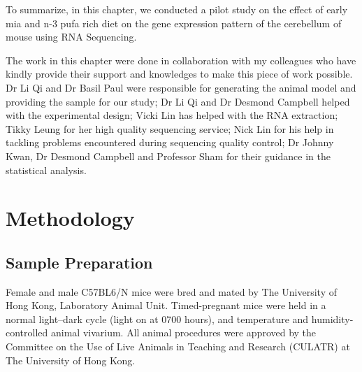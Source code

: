 To summarize, in this chapter, we conducted a pilot study on the effect of early \gls{mia} and n-3 \gls{pufa} rich diet on the gene expression pattern of the cerebellum of mouse using RNA Sequencing.

The work in this chapter were done in collaboration with my colleagues who have kindly provide their support and knowledges to make this piece of work possible.
Dr Li Qi and Dr Basil Paul were responsible for generating the animal model and providing the sample for our study;
Dr Li Qi and Dr Desmond Campbell helped with the experimental design;
Vicki Lin has helped with the RNA extraction; 
Tikky Leung for her high quality sequencing service;
Nick Lin for his help in tackling problems encountered during sequencing quality control; 
Dr Johnny Kwan, Dr Desmond Campbell and Professor Sham for their guidance in the statistical analysis.

\section{Methodology}
\subsection{Sample Preparation}
Female and male C57BL6/N mice were bred and mated by The University of Hong Kong, Laboratory Animal Unit. 
Timed-pregnant mice were held in a normal light–dark cycle (light on at 0700 hours), and temperature and humidity-controlled animal vivarium. 
All animal procedures were approved by the Committee on the Use of Live Animals in Teaching and Research (CULATR) at The University of Hong Kong.

